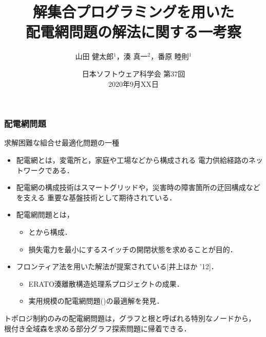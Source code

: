 \documentclass[dvipdfmx,11pt]{beamer}
\title{解集合プログラミングを用いた\\配電網問題の解法に関する一考察}
\author[山田 健太郎，湊 真一，番原 睦則]{山田 健太郎$^1$，湊 真一$^2$，番原 睦則$^1$}
\date{日本ソフトウェア科学会 第37回\\2020年9月XX日}
\institute{1.名古屋大学$\qquad$ 2.京都大学}
\begin{document}
\begin{frame}\frametitle{}
  \titlepage
\end{frame}

\begin{frame}\frametitle{配電網問題}
 \begin{alertblock}{}
  \centering
  求解困難な組合せ最適化問題の一種
 \end{alertblock}

 \begin{itemize}
  \item  \alert{配電網}とは，変電所と，家庭や工場などから構成される
		 電力供給経路のネットワークである．
  \item  配電網の構成技術はスマートグリッドや，災害時の障害箇所の迂回構成などを支える
		 重要な基盤技術として期待されている．
  \item  \alert{配電網問題}とは，
		 \begin{itemize}
		  \item {}とから構成．
		  \item 損失電力を最小にするスイッチの開閉状態を求めることが目的．
		 \end{itemize}
  \item フロンティア法を用いた解法が提案されている[井上ほか '12]． 
		\begin{itemize}
		 \item ERATO湊離散構造処理系プロジェクトの成果．
		 \item 実用規模の配電網問題()の最適解を発見．
		\end{itemize}
 \end{itemize}

 \vspace{-0.25cm}
 \pause
 \begin{alertblock}{}
  トポロジ制約のみの配電網問題は，グラフと根と呼ばれる特別なノードから，
  \alert{根付き全域森}を求める部分グラフ探索問題に帰着できる．
 \end{alertblock}
  
\end{frame}
\end{document}
